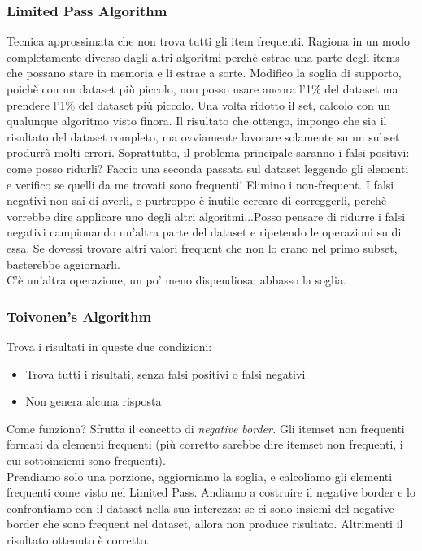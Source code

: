 \newpage

\subsubsection{Limited Pass Algorithm}
Tecnica approssimata che non trova tutti gli item frequenti. Ragiona in un modo completamente diverso dagli altri algoritmi perchè estrae una parte degli items che possano stare in memoria e li estrae a sorte. Modifico la soglia di supporto, poichè con un dataset più piccolo, non posso usare ancora l'1\% del dataset ma prendere l'1\% del dataset più piccolo. Una volta ridotto il set, calcolo con un qualunque algoritmo visto finora. Il risultato che ottengo, impongo che sia il risultato del dataset completo, ma ovviamente lavorare solamente su un subset produrrà molti errori. Soprattutto, il problema principale saranno i falsi positivi: come posso ridurli? Faccio una seconda passata sul dataset leggendo gli elementi e verifico se quelli da me trovati sono frequenti! Elimino i non-frequent. I falsi negativi non sai di averli, e purtroppo è inutile cercare di correggerli, perchè vorrebbe dire applicare uno degli altri algoritmi...Posso pensare di ridurre i falsi negativi campionando un'altra parte del dataset e ripetendo le operazioni su di essa. Se dovessi trovare altri valori frequent che non lo erano nel primo subset, basterebbe aggiornarli. 
\\
C'è un'altra operazione, un po' meno dispendiosa: abbasso la soglia.  

\subsubsection{Toivonen's Algorithm}
Trova i risultati in queste due condizioni:
\begin{itemize}
    \item Trova tutti i risultati, senza falsi positivi o falsi negativi
    \item Non genera alcuna risposta
\end{itemize}
Come funziona? Sfrutta il concetto di \textit{negative border.} Gli itemset non frequenti formati da elementi frequenti (più corretto sarebbe dire itemset non frequenti, i cui sottoinsiemi sono frequenti). 
\\
Prendiamo solo una porzione, aggiorniamo la soglia, e calcoliamo gli elementi frequenti come visto nel Limited Pass. Andiamo a costruire il negative border e lo confrontiamo con il dataset nella sua interezza: se ci sono insiemi del negative border che sono frequent nel dataset, allora non produce risultato. Altrimenti il risultato ottenuto è corretto. 

